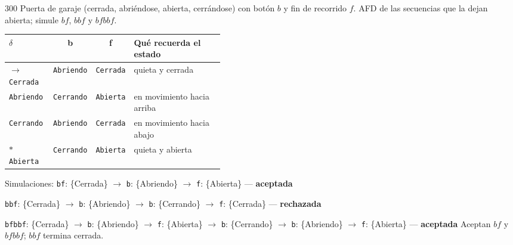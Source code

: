 \documentclass[11pt]{article}
\begin{document}
\begin{ejercicio}{300}{}
Puerta de garaje (cerrada, abriéndose, abierta, cerrándose) con botón $b$ y fin de recorrido $f$. AFD de las secuencias que la dejan abierta; simule $bf$, $bbf$ y $bfbbf$.
\end{ejercicio}
\proc \begin{center}\small\begin{tabular}{lccp{0.42\linewidth}}\toprule
$\delta$ & b & f & Qué recuerda el estado \\\midrule
$\to$ \texttt{Cerrada} & \texttt{Abriendo} & \texttt{Cerrada} & quieta y cerrada \\
 \texttt{Abriendo} & \texttt{Cerrando} & \texttt{Abierta} & en movimiento hacia arriba \\
 \texttt{Cerrando} & \texttt{Abriendo} & \texttt{Cerrada} & en movimiento hacia abajo \\
$*$ \texttt{Abierta} & \texttt{Cerrando} & \texttt{Abierta} & quieta y abierta \\
\bottomrule\end{tabular}\end{center}
Simulaciones: \texttt{bf}: \{Cerrada\} $\to$ \texttt{b}: \{Abriendo\} $\to$ \texttt{f}: \{Abierta\} — \textbf{aceptada}\par \texttt{bbf}: \{Cerrada\} $\to$ \texttt{b}: \{Abriendo\} $\to$ \texttt{b}: \{Cerrando\} $\to$ \texttt{f}: \{Cerrada\} — \textbf{rechazada}\par \texttt{bfbbf}: \{Cerrada\} $\to$ \texttt{b}: \{Abriendo\} $\to$ \texttt{f}: \{Abierta\} $\to$ \texttt{b}: \{Cerrando\} $\to$ \texttt{b}: \{Abriendo\} $\to$ \texttt{f}: \{Abierta\} — \textbf{aceptada}
\resp Aceptan $bf$ y $bfbbf$; $bbf$ termina cerrada.
\end{document}
